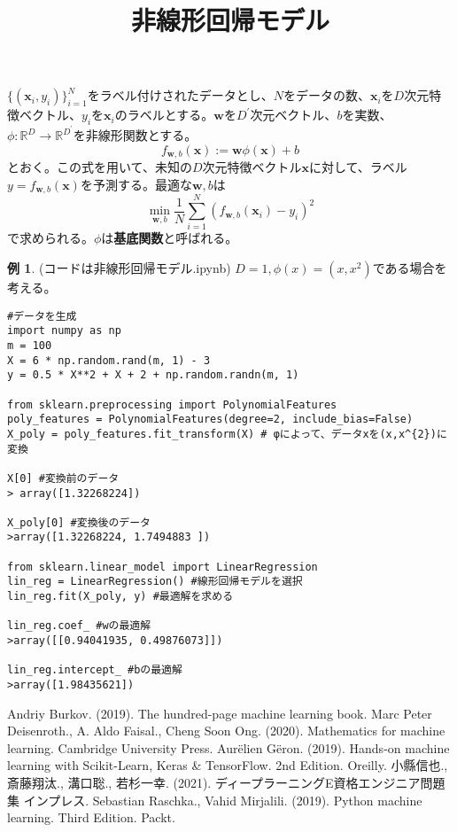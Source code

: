 \documentclass{jsarticle}
\theoremstyle{definition}
\newtheorem{ex}{例}[section]
\begin{document}
\title{非線形回帰モデル}
\date{}
\maketitle
$\{(\mathbf{x}_{i},y_{i})\}_{i=1}^{N}$をラベル付けされたデータとし、$N$をデータの数、$\mathbf{x}_{i}$を$D$次元特徴ベクトル、$y_{i}$を$\mathbf{x}_{i}$のラベルとする。$\mathbf{w}$を$D^{\prime}$次元ベクトル、$b$を実数、
$\phi:\mathbb{R}^{D}\rightarrow \mathbb{R}^{D^{\prime}}$を非線形関数とする。
\begin{equation*}
f_{\mathbf{w},b}(\mathbf{x}):=\mathbf{w}\phi(\mathbf{x})+b
\end{equation*}
とおく。この式を用いて、未知の$D$次元特徴ベクトル$\mathbf{x}$に対して、ラベル$y=f_{\mathbf{w},b}(\mathbf{x})$を予測する。最適な$\mathbf{w},b$は
\begin{equation*}
\min_{\mathbf{w},b}\frac{1}{N}\sum_{i=1}^{N}(f_{\mathbf{w},b}(\mathbf{x}_{i})-y_{i})^{2}
\end{equation*}
で求められる。$\phi$は\textbf{基底関数}と呼ばれる。
\begin{ex} (コードは非線形回帰モデル.ipynb) $D=1,\phi(x)=(x,x^{2})$である場合を考える。
\begin{verbatim}
#データを生成
import numpy as np
m = 100
X = 6 * np.random.rand(m, 1) - 3
y = 0.5 * X**2 + X + 2 + np.random.randn(m, 1)

from sklearn.preprocessing import PolynomialFeatures
poly_features = PolynomialFeatures(degree=2, include_bias=False)
X_poly = poly_features.fit_transform(X) # φによって、データxを(x,x^{2})に変換

X[0] #変換前のデータ
> array([1.32268224])

X_poly[0] #変換後のデータ
>array([1.32268224, 1.7494883 ])

from sklearn.linear_model import LinearRegression
lin_reg = LinearRegression() #線形回帰モデルを選択
lin_reg.fit(X_poly, y) #最適解を求める

lin_reg.coef_ #wの最適解
>array([[0.94041935, 0.49876073]])

lin_reg.intercept_ #bの最適解
>array([1.98435621])
\end{verbatim}
\end{ex}
\begin{thebibliography}{99}
 Andriy Burkov. (2019). The hundred-page machine learning book.
 Marc Peter Deisenroth., A. Aldo Faisal., Cheng Soon Ong. (2020). Mathematics for machine learning. Cambridge University Press.
 Aur\"{e}lien G\"{e}ron. (2019). Hands-on machine learning with Scikit-Learn, Keras \&  TensorFlow. 2nd Edition. Oreilly.
 小縣信也., 斎藤翔汰., 溝口聡., 若杉一幸. (2021). ディープラーニングE資格エンジニア問題集 インプレス.
 Sebastian Raschka., Vahid Mirjalili. (2019). Python machine learning. Third Edition. Packt.

\end{thebibliography}
\end{document}
